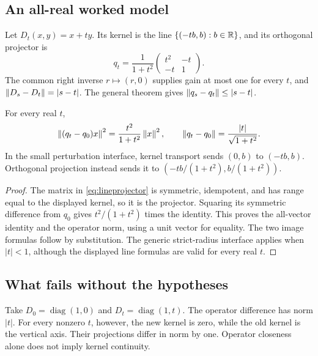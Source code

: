 \subsection{An all-real worked model}
Let \(D_t(x,y)=x+ty\). Its kernel is the line \(\{(-tb,b):b\in\mathbb R\}\), and its orthogonal projector is
\begin{equation}\label{eq:lineprojector}
 q_t=\frac1{1+t^2}
 \begin{pmatrix}t^2&-t\\-t&1\end{pmatrix}.
\end{equation}
The common right inverse \(r\mapsto(r,0)\) supplies gain at most one for every \(t\), and \(\left\lVert D_s-D_t\right\rVert=|s-t|\). The general theorem gives \(\left\lVert q_s-q_t\right\rVert\le|s-t|\).

\begin{proposition}\label{KS51}
For every real \(t\),
\[
 \left\lVert(q_t-q_0)x\right\rVert^2=\frac{t^2}{1+t^2}\left\lVert x\right\rVert^2,
 \qquad \left\lVert q_t-q_0\right\rVert=\frac{|t|}{\sqrt{1+t^2}}.
\]
In the small perturbation interface, kernel transport sends \((0,b)\) to \((-tb,b)\). Orthogonal projection instead sends it to \((-tb/(1+t^2),b/(1+t^2))\).
\end{proposition}
\begin{proof}
The matrix in \eqref{eq:lineprojector} is symmetric, idempotent, and has range equal to the displayed kernel, so it is the projector. Squaring its symmetric difference from \(q_0\) gives \(t^2/(1+t^2)\) times the identity. This proves the all-vector identity and the operator norm, using a unit vector for equality. The two image formulas follow by substitution. The generic strict-radius interface applies when \(|t|<1\), although the displayed line formulas are valid for every real \(t\).
\end{proof}


\subsection{What fails without the hypotheses}
Take \(D_0=\operatorname{diag}(1,0)\) and \(D_t=\operatorname{diag}(1,t)\). The operator difference has norm \(|t|\). For every nonzero \(t\), however, the new kernel is zero, while the old kernel is the vertical axis. Their projections differ in norm by one. Operator closeness alone does not imply kernel continuity.


